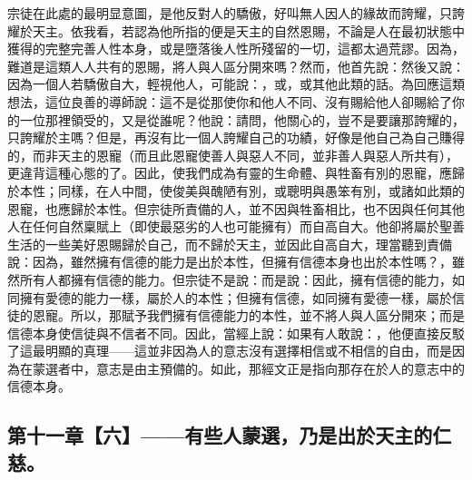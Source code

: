 宗徒在此處的最明显意圖，是他反對人的驕傲，好叫無人因人的緣故而誇耀，只誇耀於天主。依我看，若認為他所指的便是天主的自然恩賜，不論是人在最初狀態中獲得的完整完善人性本身，或是墮落後人性所殘留的一切，這都太過荒謬。因為，難道是這類人人共有的恩賜，將人與人區分開來嗎？然而，他首先說：然後又說：因為一個人若驕傲自大，輕視他人，可能說：，或，或其他此類的話。為回應這類想法，這位良善的導師說：這不是從那使你和他人不同、沒有賜給他人卻賜給了你的一位那裡領受的，又是從誰呢？他說：請問，他關心的，豈不是要讓那誇耀的，只誇耀於主嗎？但是，再沒有比一個人誇耀自己的功績，好像是他自己為自己賺得的，而非天主的恩寵（而且此恩寵使善人與惡人不同，並非善人與惡人所共有），更違背這種心態的了。因此，使我們成為有靈的生命體、與牲畜有別的恩寵，應歸於本性；同樣，在人中間，使俊美與醜陋有別，或聰明與愚笨有別，或諸如此類的恩寵，也應歸於本性。但宗徒所責備的人，並不因與牲畜相比，也不因與任何其他人在任何自然稟賦上（即使最惡劣的人也可能擁有）而自高自大。他卻將屬於聖善生活的一些美好恩賜歸於自己，而不歸於天主，並因此自高自大，理當聽到責備說：因為，雖然擁有信德的能力是出於本性，但擁有信德本身也出於本性嗎？，雖然所有人都擁有信德的能力。但宗徒不是說：而是說：因此，擁有信德的能力，如同擁有愛德的能力一樣，屬於人的本性；但擁有信德，如同擁有愛德一樣，屬於信徒的恩寵。所以，那賦予我們擁有信德能力的本性，並不將人與人區分開來；而是信德本身使信徒與不信者不同。因此，當經上說：如果有人敢說：，他便直接反駁了這最明顯的真理——這並非因為人的意志沒有選擇相信或不相信的自由，而是因為在蒙選者中，意志是由主預備的。如此，那經文正是指向那存在於人的意志中的信德本身。\par


\subsection{第十一章【六】——有些人蒙選，乃是出於天主的仁慈。}

